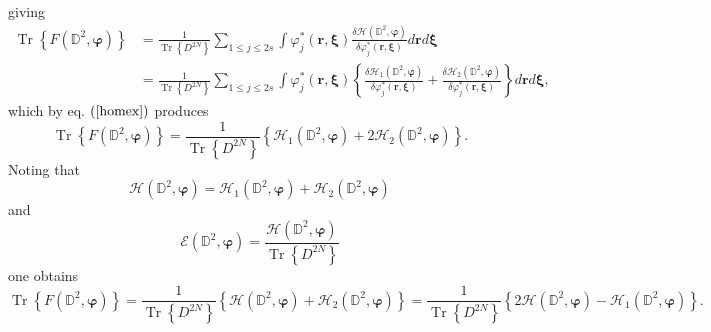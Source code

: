 \documentclass[aps,preprint]{revtex4}%
\begin{document}
giving%
\begin{align}
\operatorname{Tr}\left\{  F\left(  \mathbb{D}^{2},\mathbf{\varphi}\right)
\right\}   &  =\frac{1}{\operatorname{Tr}\left\{  D^{2N}\right\}  }%
{\textstyle\sum\limits_{1\leq j\leq2s}}
\int\varphi_{j}^{\ast}\left(  \mathbf{r,\xi}\right)  \frac{\delta
\mathcal{H}\left(  \mathbb{D}^{2},\mathbf{\varphi}\right)  }{\delta\varphi
_{j}^{\ast}\left(  \mathbf{r,\xi}\right)  }d\mathbf{r}d\mathbf{\xi}\\
&  \mathbf{=}\frac{1}{\operatorname{Tr}\left\{  D^{2N}\right\}  }%
{\textstyle\sum\limits_{1\leq j\leq2s}}
\int\varphi_{j}^{\ast}\left(  \mathbf{r,\xi}\right)  \left\{  \frac
{\delta\mathcal{H}_{1}\left(  \mathbb{D}^{2},\mathbf{\varphi}\right)  }%
{\delta\varphi_{j}^{\ast}\left(  \mathbf{r,\xi}\right)  }+\frac{\delta
\mathcal{H}_{2}\left(  \mathbb{D}^{2},\mathbf{\varphi}\right)  }{\delta
\varphi_{j}^{\ast}\left(  \mathbf{r,\xi}\right)  }\right\}  d\mathbf{r}%
d\mathbf{\xi,}%
\end{align}
which by eq. $\left(  \ref{homex}\right)  $ produces
\begin{equation}
\operatorname{Tr}\left\{  F\left(  \mathbb{D}^{2},\mathbf{\varphi}\right)
\right\}  =\frac{1}{\operatorname{Tr}\left\{  D^{2N}\right\}  }\left\{
\mathcal{H}_{1}\left(  \mathbb{D}^{2},\mathbf{\varphi}\right)  +2\mathcal{H}%
_{2}\left(  \mathbb{D}^{2},\mathbf{\varphi}\right)  \right\}  .
\end{equation}
Noting that
\begin{equation}
\mathcal{H}\left(  \mathbb{D}^{2},\mathbf{\varphi}\right)  =\mathcal{H}%
_{1}\left(  \mathbb{D}^{2},\mathbf{\varphi}\right)  +\mathcal{H}_{2}\left(
\mathbb{D}^{2},\mathbf{\varphi}\right)
\end{equation}
and
\begin{equation}
\mathcal{E}\left(  \mathbb{D}^{2},\mathbf{\varphi}\right)  =\frac
{\mathcal{H}\left(  \mathbb{D}^{2},\mathbf{\varphi}\right)  }%
{\operatorname{Tr}\left\{  D^{2N}\right\}  }%
\end{equation}
one obtains
\begin{equation}
\operatorname{Tr}\left\{  F\left(  \mathbb{D}^{2},\mathbf{\varphi}\right)
\right\}  =\frac{1}{\operatorname{Tr}\left\{  D^{2N}\right\}  }\left\{
\mathcal{H}\left(  \mathbb{D}^{2},\mathbf{\varphi}\right)  +\mathcal{H}%
_{2}\left(  \mathbb{D}^{2},\mathbf{\varphi}\right)  \right\}  =\frac
{1}{\operatorname{Tr}\left\{  D^{2N}\right\}  }\left\{  2\mathcal{H}\left(
\mathbb{D}^{2},\mathbf{\varphi}\right)  -\mathcal{H}_{1}\left(  \mathbb{D}%
^{2},\mathbf{\varphi}\right)  \right\}  .
\end{equation}
\end{document}
